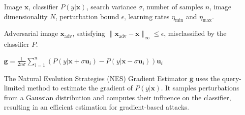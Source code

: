 
Image $\mathbf{x}$, classifier $P(y|\mathbf{x})$, search variance $\sigma$, number of samples $n$, image dimensionality $N$, perturbation bound $\epsilon$, learning rates $\eta_{\text{min}}$ and $\eta_{\text{max}}$.

Adversarial image $\mathbf{x}_{\text{adv}}$, satisfying $\|\mathbf{x}_{\text{adv}} - \mathbf{x}\|_\infty \leq \epsilon$, misclassified by the classifier $P$.

$\mathbf{g} = \frac{1}{2n\sigma} \sum_{i=1}^{n} \left( P(y|\mathbf{x} + \sigma \mathbf{u}_i) - P(y|\mathbf{x} - \sigma \mathbf{u}_i) \right) \mathbf{u}_i$

The Natural Evolution Strategies (NES) Gradient Estimator $\mathbf{g}$ uses the query-limited method to estimate the gradient of $P(y|\mathbf{x})$. It samples perturbations from a Gaussian distribution and computes their influence on the classifier, resulting in an efficient estimation for gradient-based attacks.